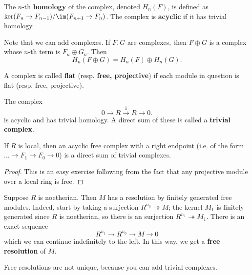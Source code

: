 \begin{definition} 
The $n$-th \textbf{homology} of the complex, denoted $H_n(F)$, is defined as
$\ker(F_n \to F_{n-1})/\im(F_{n+1} \to F_n)$.
The complex is \textbf{acyclic} if it has trivial homology.
\end{definition} 

Note that we can add complexes. If $F, G$ are complexes, then $F \oplus G$ is a
complex whose $n$-th term is $F_n \oplus G_n$. Then 
\[ H_n(F \oplus G) = H_n(F) \oplus H_n(G).  \]

\begin{definition} 
A complex is called \textbf{flat} (resp. \textbf{free, projective}) if each
module in question is flat (resp. free, projective).
\end{definition} 


\begin{example} 
The complex
\[ 0 \to R \stackrel{1}{\to}R \to 0 .  \]
is acyclic and has trivial homology. A direct sum of these is called a
\textbf{trivial complex}.
\end{example} 

\begin{lemma} 
If $R$ is local, then an acyclic free complex with a right endpoint (i.e. of
the form $\dots \to F_1 \to F_0 \to 0$) is a direct sum of trivial complexes.
\end{lemma} 
\begin{proof} 
This is an easy exercise following from the fact that any projective
module over a local ring is free.
\end{proof} 


Suppose $R$ is noetherian. Then $M$ has a resolution by finitely generated free
modules. Indeed, start by taking a surjection $R^{n_0} \twoheadrightarrow M$;
the kernel $M_1$ is finitely generated since $R$ is noetherian, so there is an
surjection $R^{n_1} \twoheadrightarrow M_1$. There is an exact sequence
\[ R^{n_1} \to R^{n_0} \to M \to 0  \]
which we can continue indefinitely to the left. 
In this way, we get a \textbf{free resolution} of $M$. 


Free resolutions are not unique, because you can add trivial complexes.  

